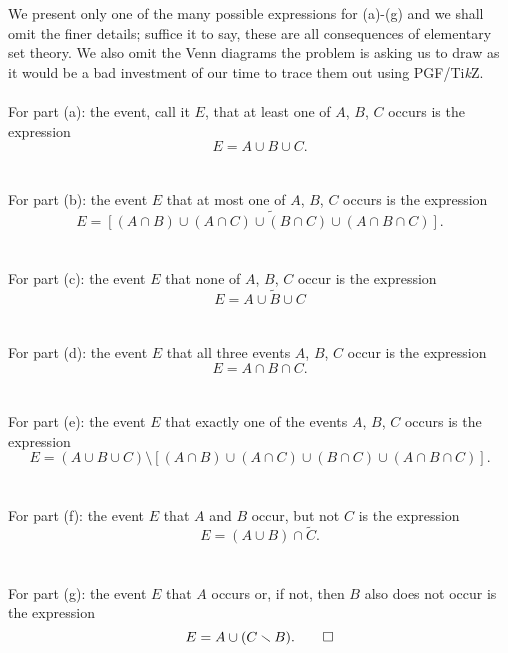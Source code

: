 \begin{solution*}
  We present only one of the many possible expressions for (a)-(g) and we
  shall omit the finer details; suffice it to say, these are all
  consequences of elementary set theory. We also omit the Venn diagrams the
  problem is asking us to draw as it would be a bad investment of our time
  to trace them out using PGF/Ti\textit{k}Z.
  \\\\
  For part (a): the event, call it \(E\), that at least one of \(A\),
  \(B\), \(C\) occurs is the expression
  \[
    E=A\cup B\cup C.
  \]
  \\\\
  For part (b): the event \(E\) that at most one of \(A\), \(B\), \(C\)
  occurs is the expression
  \[
    E=\widetilde{\left[(A\cap B)\cup (A\cap C)\cup (B\cap C)\cup (A\cap
      B\cap C)\right]}.
  \]
  \\\\
  For part (c): the event \(E\) that none of \(A\), \(B\), \(C\) occur is
  the expression
  \[
    E=\widetilde{A\cup B\cup C}
  \]
  \\\\
  For part (d): the event \(E\) that all three events \(A\), \(B\), \(C\)
  occur is the expression
  \[
    E=A\cap B\cap C.
  \]
  \\\\
  For part (e): the event \(E\) that exactly one of the events \(A\),
  \(B\), \(C\) occurs is the expression
  \[
    E=(A\cup B\cup C)\setminus \left[(A\cap B)\cup (A\cap C)\cup (B\cap
      C)\cup (A\cap B\cap C)\right].
  \]
  \\\\
  For part (f): the event \(E\) that \(A\) and \(B\) occur, but not \(C\)
  is the expression
  \[
    E=(A\cup B)\cap \tilde C.
  \]
  \\\\
  For part (g): the event \(E\) that \(A\) occurs or, if not, then \(B\)
  also does not occur is the expression
  \[
    E=A\cup(C\setminus B).\qedhere
  \]
\end{solution*}

